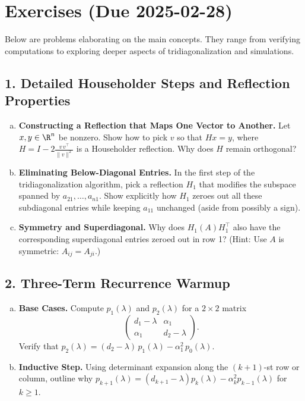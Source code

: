 \documentclass[letterpaper,11pt,oneside,reqno]{article}
\numberwithin{equation}{section}
\theoremstyle{definition}
\begin{document}
\section{Exercises (Due 2025-02-28)}
\label{sec:exercises}

Below are problems elaborating on the main concepts. They range from verifying computations to exploring deeper aspects of tridiagonalization and simulations.

\subsection*{1. Detailed Householder Steps and Reflection Properties}

\begin{enumerate}[(a)]
\item {\bf Constructing a Reflection that Maps One Vector to Another.}
  Let $x,y\in \R^n$ be nonzero. Show how to pick $v$ so that $Hx=y$, where $H=I-2\frac{v\,v^\top}{\|v\|^2}$ is a Householder reflection. Why does $H$ remain orthogonal?
\item {\bf Eliminating Below-Diagonal Entries.}
  In the first step of the tridiagonalization algorithm, pick a reflection $H_1$ that modifies the subspace spanned by $a_{21},\dots,a_{n1}$. Show explicitly how $H_1$ zeroes out all these subdiagonal entries while keeping $a_{11}$ unchanged (aside from possibly a sign).
\item {\bf Symmetry and Superdiagonal.}
  Why does $H_1 (A) H_1^\top$ also have the corresponding superdiagonal entries zeroed out in row 1? (Hint: Use $A$ is symmetric: $A_{ij}=A_{ji}$.)
\end{enumerate}

\subsection*{2. Three-Term Recurrence Warmup}

\begin{enumerate}[(a)]
\item {\bf Base Cases.} Compute $p_1(\lambda)$ and $p_2(\lambda)$ for a $2\times2$ matrix
\[
  \begin{pmatrix}
    d_1-\lambda & \alpha_1 \\
    \alpha_1 & d_2-\lambda
  \end{pmatrix}.
\]
Verify that $p_2(\lambda) = (d_2-\lambda)\,p_1(\lambda) - \alpha_1^2\,p_0(\lambda)$.
\item {\bf Inductive Step.} Using determinant expansion along the $(k+1)$-st row or column, outline why $p_{k+1}(\lambda) = (d_{k+1}-\lambda)p_k(\lambda) - \alpha_k^2 p_{k-1}(\lambda)$ for $k\ge1$.
\end{enumerate}
\end{document}
